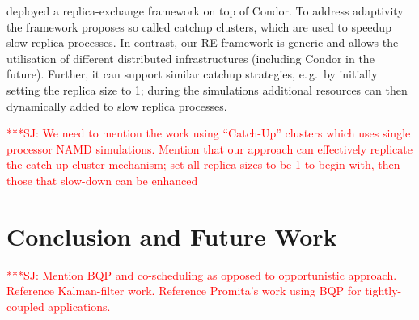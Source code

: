 \documentclass{rspublic}
\newcommand{\alnote}[1]{ {\textcolor{blue} { ***AL: #1 }}}
\newcommand{\jhanote}[1]{ {\textcolor{red} { ***SJ: #1 }}}
\newcommand{\alnote}[1]{}
\newcommand{\jhanote}[1]{}
\begin{document}
{\cite{Woods:2005nx} deployed a replica-exchange framework on top of Condor. 
To address adaptivity the framework proposes so called catchup clusters,
which are used to speedup slow replica processes. In contrast, our RE 
framework is generic and allows the utilisation of different distributed 
infrastructures (including Condor in the future). Further, it can support 
similar catchup strategies, e.\,g.\ by initially setting
the replica size  to 1; during the simulations additional resources 
can then dynamically added to slow replica processes. 

\jhanote{We need to mention the work using ``Catch-Up'' clusters which
  uses single processor NAMD simulations. Mention that our approach
  can effectively replicate the catch-up cluster mechanism; set all
  replica-sizes to be 1 to begin with, then those that slow-down can
  be enhanced}



\section{Conclusion and Future Work}

\jhanote{Mention BQP and co-scheduling as opposed to opportunistic
  approach. Reference Kalman-filter work. Reference Promita's work
  using BQP for tightly-coupled applications.} 
                
}
\end{document}
